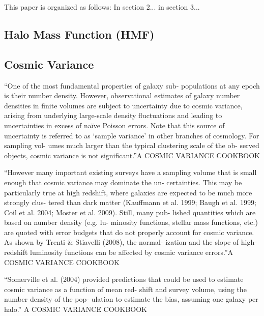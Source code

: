This paper is organized as follows: In section 2... in section 3...

  \subsection{Halo Mass Function (HMF)}


  
  
  
  \subsection{Cosmic Variance}
  

``One of the most fundamental properties of galaxy sub-
populations at any epoch is their number density. However,
observational estimates of galaxy number densities in finite
volumes are subject to uncertainty due to cosmic variance,
arising from underlying large-scale density fluctuations and
leading to uncertainties in excess of naïve Poisson errors.
Note that this source of uncertainty is referred to as ‘sample
variance’ in other branches of cosmology. For sampling vol-
umes much larger than the typical clustering scale of the ob-
served objects, cosmic variance is not significant.''A COSMIC VARIANCE COOKBOOK

``However many important existing surveys have a sampling volume that
is small enough that cosmic variance may dominate the un-
certainties. This may be particularly true at high redshift,
where galaxies are expected to be much more strongly clus-
tered than dark matter (Kauffmann et al. 1999; Baugh et al.
1999; Coil et al. 2004; Moster et al. 2009). Still, many pub-
lished quantities which are based on number density (e.g. lu-
minosity functions, stellar mass functions, etc.) are quoted
with error budgets that do not properly account for cosmic
variance. As shown by Trenti \& Stiavelli (2008), the normal-
ization and the slope of high-redshift luminosity functions can
be affected by cosmic variance errors.''A COSMIC VARIANCE COOKBOOK

``Somerville et al. (2004) provided predictions that could be
used to estimate cosmic variance as a function of mean red-
shift and survey volume, using the number density of the pop-
ulation to estimate the bias, assuming one galaxy per halo.'' A COSMIC VARIANCE
COOKBOOK


